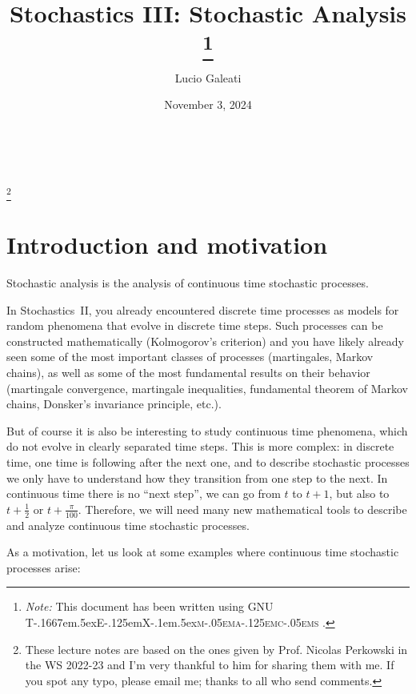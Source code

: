 \documentclass{article}
\newcommand{\TeXmacs}{T\kern-.1667em\lower.5ex\hbox{E}\kern-.125emX\kern-.1em\lower.5ex\hbox{\textsc{m\kern-.05ema\kern-.125emc\kern-.05ems}}}
\newcommand{\citetexmacs}[1]{This document has been written using GNU {\TeXmacs} \cite{#1}.}
\newcommand{\tmnote}[1]{\thanks{\textit{Note:} #1}}
\newcommand{\1}{\mathbbm{1}}
\begin{document}
\

\title{
  Stochastics III: Stochastic Analysis
  \tmnote{{\citetexmacs{TeXmacs:website}}}
}

\author{Lucio Galeati}

\date{November 3, 2024}

\maketitle

\footnote{These lecture notes are based on the ones given by Prof. Nicolas
Perkowski in the WS 2022-23 and I'm very thankful to him for sharing them with
me. If you spot any typo, please email me; thanks to all who send comments.}

{\tableofcontents}

\section*{Introduction and motivation}

Stochastic analysis is the analysis of continuous time stochastic processes.

In Stochastics~II, you already encountered discrete time processes as models
for random phenomena that evolve in discrete time steps. Such processes can be
constructed mathematically (Kolmogorov's criterion) and you have likely
already seen some of the most important classes of processes (martingales,
Markov chains), as well as some of the most fundamental results on their
behavior (martingale convergence, martingale inequalities, fundamental theorem
of Markov chains, Donsker's invariance principle, etc.).

But of course it is also be interesting to study continuous time phenomena,
which do not evolve in clearly separated time steps. This is more complex: in
discrete time, one time is following after the next one, and to describe
stochastic processes we only have to understand how they transition from one
step to the next. In continuous time there is no ``next step'', we can go from
$t$ to $t + 1$, but also to $t + \frac{1}{2}$ or $t + \frac{\pi}{100}$.
Therefore, we will need many new mathematical tools to describe and analyze
continuous time stochastic processes.

As a motivation, let us look at some examples where continuous time stochastic
processes arise:
\end{document}
